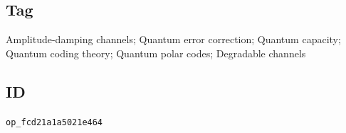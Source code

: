\subsection*{Tag}

Amplitude-damping channels; Quantum error correction; Quantum capacity;
Quantum coding theory; Quantum polar codes; Degradable channels

\subsection*{ID}

\texttt{op\_fcd21a1a5021e464}
